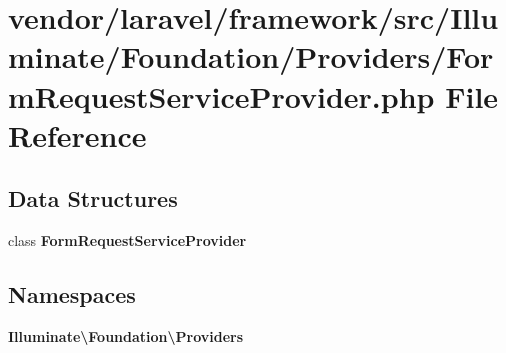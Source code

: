 \section{vendor/laravel/framework/src/\+Illuminate/\+Foundation/\+Providers/\+Form\+Request\+Service\+Provider.php File Reference}
\label{_form_request_service_provider_8php}
\subsection*{Data Structures}
\begin{DoxyCompactItemize}
\item 
class {\bf Form\+Request\+Service\+Provider}
\end{DoxyCompactItemize}
\subsection*{Namespaces}
\begin{DoxyCompactItemize}
\item 
 {\bf Illuminate\textbackslash{}\+Foundation\textbackslash{}\+Providers}
\end{DoxyCompactItemize}
